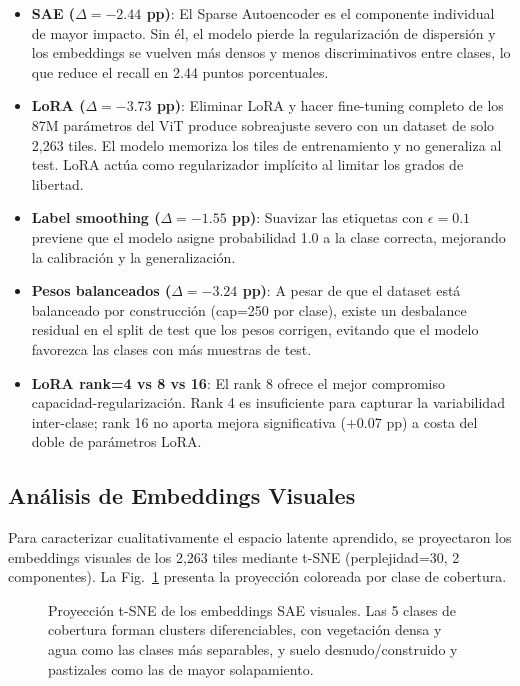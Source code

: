 \documentclass[10pt,a4paper,twocolumn]{article}
\begin{document}
\begin{itemize}[nosep, leftmargin=*, itemsep=2pt]
  \item \textbf{SAE ($\Delta = -2.44$ pp)}: El Sparse Autoencoder es el componente individual de mayor impacto. Sin él, el modelo pierde la regularización de dispersión y los embeddings se vuelven más densos y menos discriminativos entre clases, lo que reduce el recall en 2.44 puntos porcentuales.
  \item \textbf{LoRA ($\Delta = -3.73$ pp)}: Eliminar LoRA y hacer fine-tuning completo de los 87M parámetros del ViT produce sobreajuste severo con un dataset de solo 2,263 tiles. El modelo memoriza los tiles de entrenamiento y no generaliza al test. LoRA actúa como regularizador implícito al limitar los grados de libertad.
  \item \textbf{Label smoothing ($\Delta = -1.55$ pp)}: Suavizar las etiquetas con $\epsilon=0.1$ previene que el modelo asigne probabilidad 1.0 a la clase correcta, mejorando la calibración y la generalización.
  \item \textbf{Pesos balanceados ($\Delta = -3.24$ pp)}: A pesar de que el dataset está balanceado por construcción (cap=250 por clase), existe un desbalance residual en el split de test que los pesos corrigen, evitando que el modelo favorezca las clases con más muestras de test.
  \item \textbf{LoRA rank=4 vs 8 vs 16}: El rank 8 ofrece el mejor compromiso capacidad-regularización. Rank 4 es insuficiente para capturar la variabilidad inter-clase; rank 16 no aporta mejora significativa ($+$0.07 pp) a costa del doble de parámetros LoRA.
\end{itemize}

\subsection{Análisis de Embeddings Visuales}

Para caracterizar cualitativamente el espacio latente aprendido, se proyectaron los embeddings visuales de los 2,263 tiles mediante t-SNE (perplejidad=30, 2 componentes). La Fig.~\ref{fig:sit2_tsne} presenta la proyección coloreada por clase de cobertura.

\begin{figure}[H]
  \centering
  \caption{Proyección t-SNE de los embeddings SAE visuales. Las 5 clases de cobertura forman clusters diferenciables, con vegetación densa y agua como las clases más separables, y suelo desnudo/construido y pastizales como las de mayor solapamiento.}
  \label{fig:sit2_tsne}
\end{figure}
\end{document}
